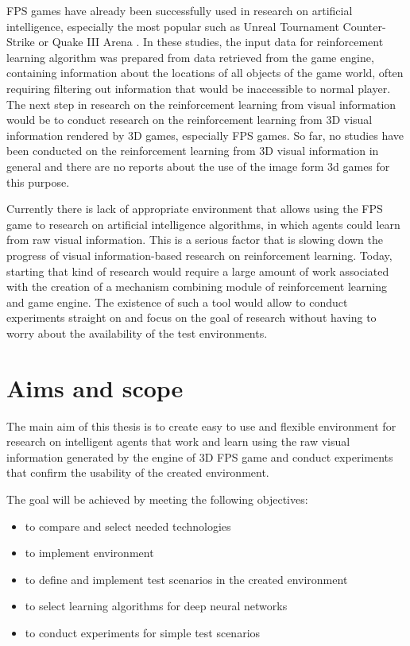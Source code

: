 FPS games have already been successfully used in research on artificial intelligence, especially the most popular such as Unreal Tournament \cite{6314567} \cite{6922494} Counter-Strike \cite{5035619} or Quake III Arena \cite{el2007hybrid}.
In these studies, the input data for reinforcement learning algorithm was prepared from data retrieved from the game engine, containing information about the locations of all objects of the game world, often requiring filtering out information that would be inaccessible to normal player.
The next step in research on the reinforcement learning from visual information would be to conduct research on the reinforcement learning from 3D visual information rendered by 3D games, especially FPS games.
So far, no studies have been conducted on the reinforcement learning from 3D visual information in general and there are no reports about the use of the image form 3d games for this purpose.


Currently there is lack of appropriate environment that allows using the FPS game to research on artificial intelligence algorithms, in which agents could learn from raw visual information.
This is a serious factor that is slowing down the progress of visual information-based research on reinforcement learning.
Today, starting that kind of research would require a large amount of work associated with the creation of a mechanism combining module of reinforcement learning and game engine.
The existence of such a tool would allow to conduct experiments straight on and focus on the goal of research without having to worry about the availability of the test environments.

\section{Aims and scope}


The main aim of this thesis is to create easy to use and flexible environment for research on intelligent agents that work and learn using the raw visual information generated by the engine of 3D FPS game and conduct experiments that confirm the usability of the created environment.

The goal will be achieved by meeting the following objectives:
\begin{itemize}
 \item to compare and select needed technologies
 \item to implement environment
 \item to define and implement test scenarios in the created environment
 \item to select learning algorithms for deep neural networks
 \item to conduct experiments for simple test scenarios
\end{itemize}


